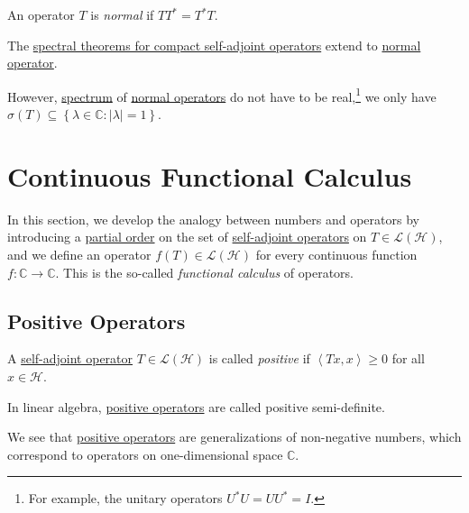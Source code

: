 \begin{definition}\label{def:normal-op}
	An operator \(T\) is \emph{normal} if \(T T^{\ast} = T^{\ast} T\).
\end{definition}

\begin{remark}
	The \hyperref[thm:spectral-theorem-for-compact-self-adjoint-op]{spectral theorems for compact self-adjoint operators} extend to \hyperref[def:normal-op]{normal operator}.
\end{remark}

However, \hyperref[def:spectrum-point]{spectrum} of \hyperref[def:normal-op]{normal operators} do not have to be real,\footnote{For example, the unitary operators \(U^{\ast} U = U U^{\ast} = I\).} we only have \(\sigma (T) \subseteq \left\{ \lambda \in \mathbb{C} \colon \vert \lambda  \vert =1 \right\} \).

\section{Continuous Functional Calculus}
In this section, we develop the analogy between numbers and operators by introducing a \hyperref[def:partial-order]{partial order} on the set of \hyperref[def:self-adjoint-op]{self-adjoint operators} on \(T\in \mathcal{L} (\mathcal{H} )\), and we define an operator \(f(T) \in \mathcal{L} (\mathcal{H} )\) for every continuous function \(f\colon \mathbb{C} \to \mathbb{C} \). This is the so-called \emph{functional calculus} of operators.

\subsection{Positive Operators}
\begin{definition}\label{def:positive-op}
	A \hyperref[def:self-adjoint-op]{self-adjoint operator} \(T\in \mathcal{L} (\mathcal{H} )\) is called \emph{positive} if \(\left\langle Tx, x \right\rangle \geq 0\) for all \(x\in \mathcal{H} \).
\end{definition}

\begin{remark}
	In linear algebra, \hyperref[def:positive-op]{positive operators} are called positive semi-definite.
\end{remark}

We see that \hyperref[def:positive-op]{positive operators} are generalizations of non-negative numbers, which correspond to operators on one-dimensional space \(\mathbb{C} \).

